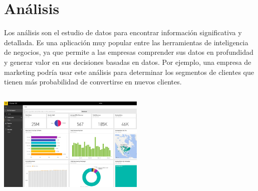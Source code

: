 \documentclass[twoside,twocolumn]{article}
\begin{document}

\section{Análisis}

\begin{enumerate}

    Los análisis son el estudio de datos para encontrar información significativa y detallada. Es una aplicación muy popular entre las herramientas de inteligencia de negocios, ya que permite a las empresas comprender sus datos en profundidad y generar valor en sus decisiones basadas en datos. Por ejemplo, una empresa de marketing podría usar este análisis para determinar los segmentos de clientes que tienen más probabilidad de convertirse en nuevos clientes.
    \\ \\
\includegraphics[width=7cm, height=5cm]{Imagenes/linea_bi1}
    
\end{enumerate}

\newpage
\end{document}
